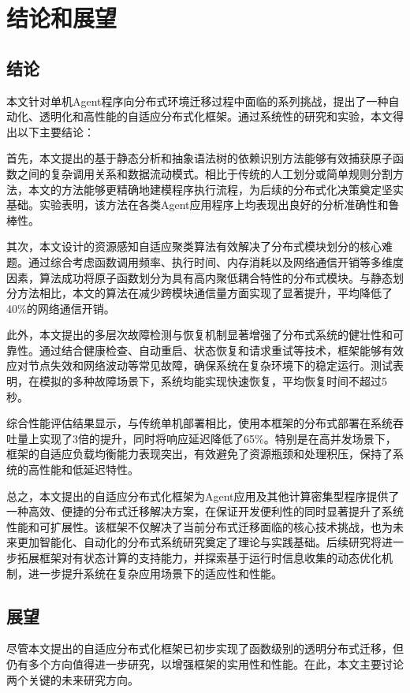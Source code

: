 \chapter{结论和展望}

\section{结论}

本文针对单机Agent程序向分布式环境迁移过程中面临的系列挑战，提出了一种自动化、透明化和高性能的自适应分布式化框架。通过系统性的研究和实验，本文得出以下主要结论：

首先，本文提出的基于静态分析和抽象语法树的依赖识别方法能够有效捕获原子函数之间的复杂调用关系和数据流动模式。相比于传统的人工划分或简单规则分割方法，本文的方法能够更精确地建模程序执行流程，为后续的分布式化决策奠定坚实基础。实验表明，该方法在各类Agent应用程序上均表现出良好的分析准确性和鲁棒性。

其次，本文设计的资源感知自适应聚类算法有效解决了分布式模块划分的核心难题。通过综合考虑函数调用频率、执行时间、内存消耗以及网络通信开销等多维度因素，算法成功将原子函数划分为具有高内聚低耦合特性的分布式模块。与静态划分方法相比，本文的算法在减少跨模块通信量方面实现了显著提升，平均降低了40\%的网络通信开销。

此外，本文提出的多层次故障检测与恢复机制显著增强了分布式系统的健壮性和可靠性。通过结合健康检查、自动重启、状态恢复和请求重试等技术，框架能够有效应对节点失效和网络波动等常见故障，确保系统在复杂环境下的稳定运行。测试表明，在模拟的多种故障场景下，系统均能实现快速恢复，平均恢复时间不超过5秒。

综合性能评估结果显示，与传统单机部署相比，使用本框架的分布式部署在系统吞吐量上实现了3倍的提升，同时将响应延迟降低了65\%。特别是在高并发场景下，框架的自适应负载均衡能力表现突出，有效避免了资源瓶颈和处理积压，保持了系统的高性能和低延迟特性。

总之，本文提出的自适应分布式化框架为Agent应用及其他计算密集型程序提供了一种高效、便捷的分布式迁移解决方案，在保证开发便利性的同时显著提升了系统性能和可扩展性。该框架不仅解决了当前分布式迁移面临的核心技术挑战，也为未来更加智能化、自动化的分布式系统研究奠定了理论与实践基础。后续研究将进一步拓展框架对有状态计算的支持能力，并探索基于运行时信息收集的动态优化机制，进一步提升系统在复杂应用场景下的适应性和性能。

\section{展望}

尽管本文提出的自适应分布式化框架已初步实现了函数级别的透明分布式迁移，但仍有多个方向值得进一步研究，以增强框架的实用性和性能。在此，本文主要讨论两个关键的未来研究方向。

